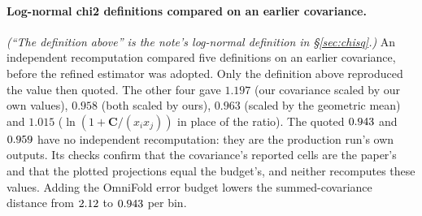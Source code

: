 \paragraph{Log-normal chi2 definitions compared on an earlier covariance.} \noindent\emph{(``The definition above'' is the note's log-normal definition in \S\ref{sec:chisq}.)} An independent recomputation compared five definitions on an earlier covariance, before the refined estimator was adopted. Only the definition above reproduced the value then quoted. The other four gave $1.197$ (our covariance scaled by our own values), $0.958$ (both scaled by ours), $0.963$ (scaled by the geometric mean) and $1.015$ ($\ln(1+\mathbf{C}/(x_{i}x_{j}))$ in place of the ratio). The quoted $0.943$ and $0.959$ have no independent recomputation: they are the production run's own outputs. Its checks confirm that the covariance's reported cells are the paper's and that the plotted projections equal the budget's, and neither recomputes these values. Adding the OmniFold error budget lowers the summed-covariance distance from $2.12$ to $0.943$ per bin. 

